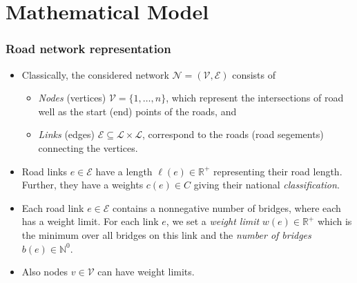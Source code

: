 \documentclass{beamer}   %
\theoremstyle{break}
\begin{document}
  \section[Mathematical Model]{Mathematical Model}
  \begin{frame}
    \frametitle{Road network representation}
    \begin{itemize}

      \item Classically,  the considered network $\mathcal{N}=(\mathcal{V},\mathcal{E})$ consists of
      \begin{itemize}
        \item \emph{Nodes} (vertices) $\mathcal{V}=\{1,\ldots, n\}$, which represent the intersections of road
        well as the start (end) points of the roads, and

        \item \emph{Links} (edges) $\mathcal{E} \subseteq \mathcal{L} \times \mathcal{L}$,
        correspond to the roads (road segements) connecting the vertices.
      \end{itemize}

      \item  Road links $e \in \mathcal{E}$ have a length $\ell(e)\in \mathbb{R}^{+}$ representing their road length.
      Further, they have a weights $c(e) \in C$ giving their national \emph{classification}.
      \item
      Each road link $e \in \mathcal{E}$ contains a nonnegative number of bridges, where each has a weight limit.
      For each link $e$, we set a \emph{weight limit} $w(e) \in \mathbb{R}^{+}$ which is the
      minimum over all bridges on this link and the \emph{number of bridges} $b(e) \in \mathbb{N}^{0}$.

      \item Also  nodes $v \in \mathcal{V}$ can have weight limits.
    \end{itemize}

  \end{frame}
\end{document}
